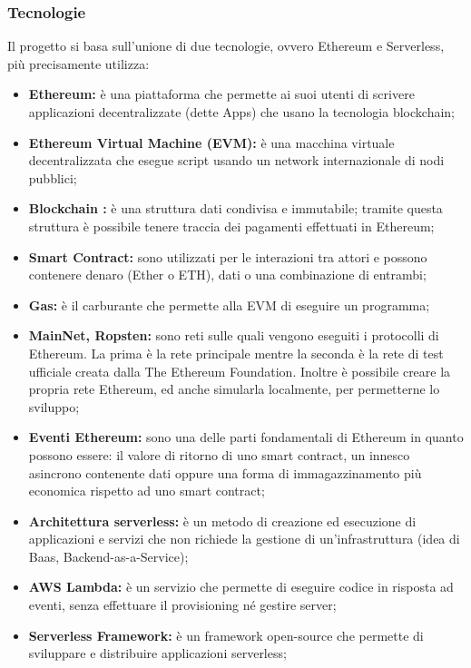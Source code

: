     \subsubsection{Tecnologie}
     Il progetto si basa sull'unione di due tecnologie, ovvero Ethereum e Serverless, più precisamente utilizza:
    		 \begin{itemize}
    			\item \textbf{Ethereum: }è una piattaforma che permette ai suoi utenti di scrivere applicazioni decentralizzate (dette \DJ Apps) che usano la tecnologia blockchain;
    			\item \textbf{Ethereum Virtual Machine (EVM): }è una macchina virtuale decentralizzata che esegue script usando un network internazionale di nodi pubblici;
    			\item \textbf{Blockchain : }è una struttura dati condivisa e immutabile;  tramite questa struttura è possibile tenere traccia dei pagamenti effettuati in Ethereum;
    			\item \textbf{Smart Contract: }sono utilizzati per le interazioni tra attori e possono contenere denaro (Ether o ETH), dati o una combinazione di entrambi;
    			\item \textbf{Gas: }è il carburante che permette alla EVM di eseguire un programma;
    		 	\item \textbf{MainNet, Ropsten: }sono reti sulle quali vengono eseguiti i protocolli di Ethereum. La prima è la rete principale mentre la seconda è la rete di test ufficiale creata dalla The Ethereum Foundation. Inoltre è possibile creare la propria rete Ethereum, ed anche simularla localmente, per permetterne lo sviluppo;
    		 	\item \textbf{Eventi Ethereum: }sono una delle parti fondamentali di Ethereum in quanto possono essere: il  valore di ritorno di uno smart contract,  un innesco asincrono contenente dati oppure una forma di  immagazzinamento più economica rispetto ad uno smart contract;
    			 \item \textbf{Architettura serverless: }è un metodo di creazione ed esecuzione di applicazioni e servizi che non richiede la gestione di un'infrastruttura (idea di Baas, Backend-as-a-Service);
    		 	\item \textbf{AWS Lambda: }è un servizio che permette di eseguire codice  in risposta ad eventi, senza effettuare il provisioning né gestire server;
    		 	\item \textbf{Serverless Framework: }è un framework open-source che permette di sviluppare e distribuire applicazioni serverless;

\end{itemize}
